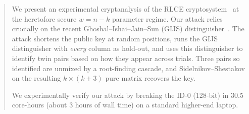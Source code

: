 \begin{abstract}
    We present an experimental cryptanalysis of the RLCE
    cryptosystem~\cite{DBLP:journals/corr/Wang15aa, RLCE-spec}
    at the heretofore secure $w=n-k$ parameter regime.  Our attack relies
    crucially on the  recent Ghoshal--Ishai--Jain--Sun (GIJS)
    distinguisher~\cite{GIJS26}. The attack shortens the public key at
    random positions, runs the GIJS distinguisher with \emph{every}
    column as hold-out, and uses this distinguisher to identify twin pairs based on how they appear across trials.
    Three pairs so identified are unmixed by a root-finding cascade,
    and Sidelnikov--Shestakov on the resulting $k \times (k+3)$ pure
    matrix recovers the key.

    We experimentally verify our attack by breaking the ID-0 (128-bit) in 30.5
    core-hours (about 3 hours of wall time) on a standard higher-end laptop.
\end{abstract}
